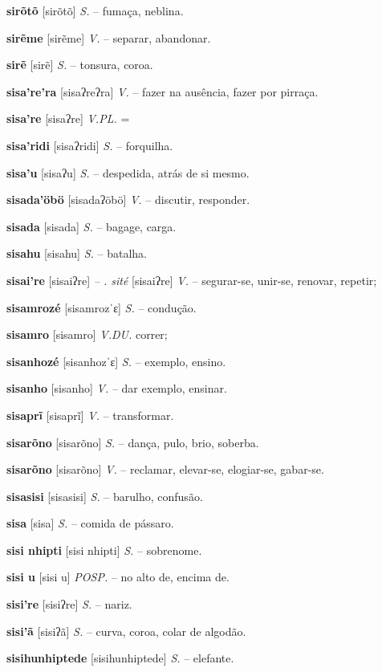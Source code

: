 \textbf{sirõtõ} [sirõtõ] \textit{S.} -- fumaça, neblina.

\textbf{sirẽme} [sirẽme] \textit{V.} -- separar, abandonar.

\textbf{sirẽ} [sirẽ] \textit{S.} -- tonsura, coroa.

\textbf{sisa're'ra} [sisaʔreʔra] \textit{V.} -- fazer na ausência, fazer por pirraça.

\textbf{sisa're} [sisaʔre] \textit{V.PL.} =

\textbf{sisa'ridi} [sisaʔridi] \textit{S.} -- forquilha.

\textbf{sisa'u} [sisaʔu] \textit{S.} -- despedida, atrás de si mesmo.

\textbf{sisada'öbö} [sisadaʔöbö] \textit{V.} -- discutir, responder.

\textbf{sisada} [sisada] \textit{S.} -- bagage, carga.

\textbf{sisahu} [sisahu] \textit{S.} -- batalha.

\textbf{sisai're} [sisaiʔre] \textit{-- . sité} [sisaiʔre] \textit{V.} -- segurar-se, unir-se, renovar, repetir;

\textbf{sisamrozé} [sisamrozˈɛ] \textit{S.} -- condução.

\textbf{sisamro} [sisamro] \textit{V.DU.} correr;

\textbf{sisanhozé} [sisanhozˈɛ] \textit{S.} -- exemplo, ensino.

\textbf{sisanho} [sisanho] \textit{V.} -- dar exemplo, ensinar.

\textbf{sisaprĩ} [sisaprĩ] \textit{V.} -- transformar.

\textbf{sisarõno} [sisarõno] \textit{S.} -- dança, pulo, brio, soberba.

\textbf{sisarõno} [sisarõno] \textit{V.} -- reclamar, elevar-se, elogiar-se, gabar-se.

\textbf{sisasisi} [sisasisi] \textit{S.} -- barulho, confusão.

\textbf{sisa} [sisa] \textit{S.} -- comida de pássaro.

\textbf{sisi nhipti} [sisi nhipti] \textit{S.} -- sobrenome.

\textbf{sisi u} [sisi u] \textit{POSP.} -- no alto de, encima de.

\textbf{sisi're} [sisiʔre] \textit{S.} -- nariz.

\textbf{sisi'ã} [sisiʔã] \textit{S.} -- curva, coroa, colar de algodão.

\textbf{sisihunhiptede} [sisihunhiptede] \textit{S.} -- elefante.


